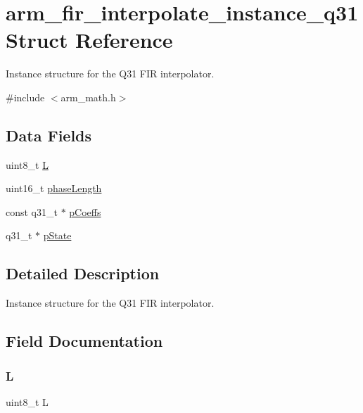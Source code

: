 \hypertarget{structarm__fir__interpolate__instance__q31}{}\section{arm\+\_\+fir\+\_\+interpolate\+\_\+instance\+\_\+q31 Struct Reference}
\label{structarm__fir__interpolate__instance__q31}


Instance structure for the Q31 F\+IR interpolator.  




{\ttfamily \#include $<$arm\+\_\+math.\+h$>$}

\subsection*{Data Fields}
\begin{DoxyCompactItemize}
\item 
uint8\+\_\+t \mbox{\hyperlink{structarm__fir__interpolate__instance__q31_aee73cc056696e504430c53eaa9c58cf0}{L}}
\item 
uint16\+\_\+t \mbox{\hyperlink{structarm__fir__interpolate__instance__q31_a8f92bb07e0812f94679438cdf412b26a}{phase\+Length}}
\item 
const q31\+\_\+t $\ast$ \mbox{\hyperlink{structarm__fir__interpolate__instance__q31_a80e7fdf4747dbda8eadb2663fb4be317}{p\+Coeffs}}
\item 
q31\+\_\+t $\ast$ \mbox{\hyperlink{structarm__fir__interpolate__instance__q31_adee4ba3ee8869865af7d8fa08ca913d6}{p\+State}}
\end{DoxyCompactItemize}


\subsection{Detailed Description}
Instance structure for the Q31 F\+IR interpolator. 

\subsection{Field Documentation}
\mbox{\label{structarm__fir__interpolate__instance__q31_aee73cc056696e504430c53eaa9c58cf0}} 
\subsubsection{\texorpdfstring{L}{L}}
{\footnotesize\ttfamily uint8\+\_\+t L}

